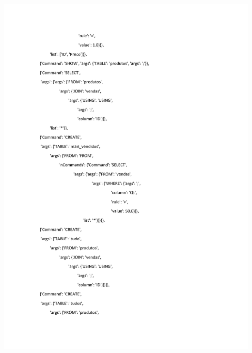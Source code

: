 \documentclass{article}
\begin{document}
\noindent
\includegraphics[width=1.3\textwidth]{1}
\end{document}
